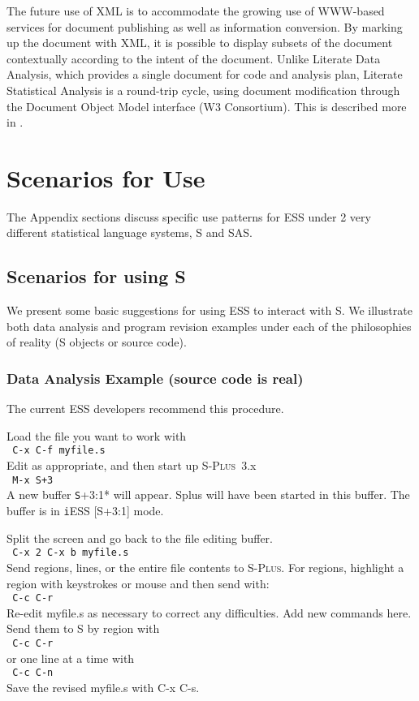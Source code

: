 \documentclass{article}
\newcommand*{\Splus}{\textsc{S-Plus}}
\newcommand{\elcode}[1]{\\{\texttt{\hspace*{2em} #1}}\\}
\begin{document}
The future use of XML is to accommodate the growing use of WWW-based
services for document publishing as well as information conversion.
By marking up the document with XML, it is possible to display subsets
of the document contextually according to the intent of the document.
Unlike Literate Data Analysis, which provides a single document for
code and analysis plan, Literate Statistical Analysis is a round-trip
cycle, using document modification through the Document Object Model
interface (W3 Consortium).  This is described more in
\citep{ross:lunt:2001}. 



\appendix


\section{Scenarios for Use}
\label{app:scenarios}

The Appendix sections discuss specific use patterns for ESS under 2 very
different statistical language systems, S and SAS.

\subsection{Scenarios for using S}
\label{sec:S:scenarios}

We present some basic suggestions for using ESS to interact with S.
We illustrate both data analysis and program revision examples under each of
the philosophies of reality (S objects or source code).

\subsubsection{Data Analysis Example (source code is real)}
The current ESS developers recommend this procedure.

\noindent
Load the file you want to work with
  \elcode{C-x C-f myfile.s}
Edit as appropriate, and then start up \Splus~3.x
  \elcode{M-x S+3}
A new buffer {\texttt *S+3:1*} will appear.  Splus will have been started
in this buffer.  The buffer is in {\texttt iESS [S+3:1]} mode.

Split the screen and go back to the file editing buffer.
  \elcode{C-x 2 C-x b myfile.s}
Send regions, lines, or the entire file contents to \Splus.
For regions, highlight a region with keystrokes or mouse
and then send with:
  \elcode{C-c C-r}
Re-edit myfile.s as necessary to correct any difficulties.  Add
new commands here.  Send them to S by region with
  \elcode{C-c C-r}
or one line at a time with
  \elcode{C-c C-n}
Save the revised myfile.s with C-x C-s.
\end{document}
